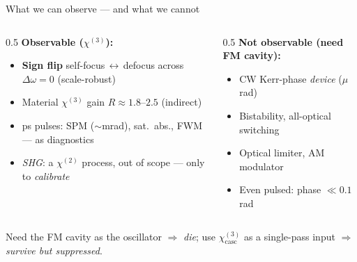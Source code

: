 \documentclass[aspectratio=169,11pt]{beamer}
\newcommand{\chitwo}{\chi^{(2)}}
\newcommand{\chithree}{\chi^{(3)}}
\newcommand{\chicasc}{\chi^{(3)}_{\mathrm{casc}}}
\newcommand{\Dom}{\Delta\omega}
\begin{document}
\begin{frame}{What we can observe --- and what we cannot}
  \small
  \begin{columns}[T]
    \begin{column}{0.5\textwidth}
      \textcolor{good}{\textbf{Observable ($\chithree$):}}
      \begin{itemize}
        \item \textbf{Sign flip} self-focus\,$\leftrightarrow$\,defocus across
              $\Dom=0$ (scale-robust)
        \item Material $\chithree$ gain $R\!\approx\!1.8$--$2.5$ (indirect)
        \item ps pulses: SPM ($\sim$mrad), sat.\ abs., FWM --- as diagnostics
        \item \emph{SHG}: a $\chitwo$ process, \alert{out of scope} --- only to \emph{calibrate}
      \end{itemize}
    \end{column}
    \begin{column}{0.5\textwidth}
      \textcolor{bad}{\textbf{Not observable (need FM cavity):}}
      \begin{itemize}
        \item CW Kerr-phase \emph{device} ($\mu$rad)
        \item Bistability, all-optical switching
        \item Optical limiter, AM modulator
        \item Even pulsed: phase $\ll0.1$\,rad
      \end{itemize}
    \end{column}
  \end{columns}
  \vspace{3pt}
  \footnotesize Need the FM cavity as the oscillator $\Rightarrow$ \emph{die}; use
  $\chicasc$ as a single-pass input $\Rightarrow$ \emph{survive but suppressed}.
\end{frame}
\end{document}
